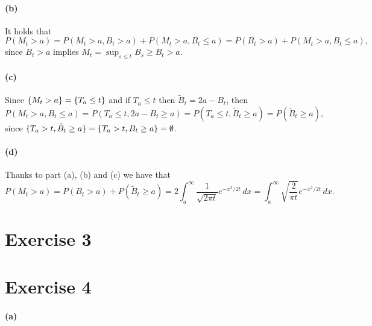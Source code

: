 \documentclass[a4paper,11pt]{article}
\theoremstyle{definition}
\theoremstyle{plain}
\theoremstyle{remark}
\DeclarePairedDelimiter{\bra}{\lbrace}{\rbrace}
\begin{document}
\paragraph*{(b)}

It holds that
$$
P(M_t>a) = P(M_t>a,B_t>a) + P(M_t>a,B_t\leq a) = P(B_t>a) + P(M_t>a,B_t\leq a),
$$
since $B_t>a$ implies $M_t = \sup_{s\leq t}B_s\geq B_t>a$.

\paragraph*{(c)}

Since $\bra{M_t > a} = \bra{T_a\leq t}$ and if $T_a\leq t$ then $\tilde{B}_t = 2a - B_t$, then
$$
P(M_t > a, B_t \leq a) = P(T_a\leq t, 2a - B_t \geq a) = P(T_a\leq t, \tilde{B}_t \geq a) = P(\tilde{B}_t \geq a),
$$ 
since $\bra{T_a> t, \tilde{B}_t \geq a} = \bra{T_a> t, B_t \geq a} = \emptyset$.

\paragraph*{(d)}

Thanks to part (a), (b) and (c) we have that
$$
P(M_t>a) =  P(B_t>a) + P(\tilde{B}_t \geq a) = 2\int_a^\infty\frac{1}{\sqrt{2\pi t}}e^{-x^2/2t}\,dx = \int_a^\infty\sqrt{\frac{2}{\pi t}}e^{-x^2/2t}\,dx.
$$

\section*{Exercise 3}



\section*{Exercise 4}

\paragraph*{(a)}
\end{document}
